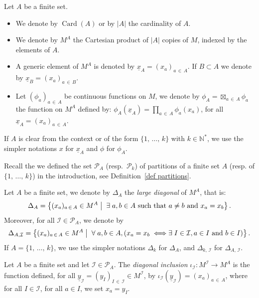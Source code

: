 \documentclass[AHL,Unicode,longabstracts,published]{cedram}
\DeclareMathOperator{\card}{Card}
\newcommand{\I}{\mathcal{I}}
\newcommand{\pa}{\mathcal{P}\!}
\newcommand{\N}{\mathbb{N}}
\newcommand{\mvert}{\mathrel{}\middle|\mathrel{}}
\let\oldexists\exists
\renewcommand*{\exists}{\mathrel{\oldexists}}
\let\oldforall\forall
\renewcommand*{\forall}{\mathrel{\oldforall}}
\begin{document}
\pagebreak
\begin{notas}\label{ntn product indexed by A}
Let $A$ be a finite set.
\begin{itemize}
\item We denote by $\card(A)$ or by $|A|$ the cardinality of $A$.
\item We denote by $M^A$ the Cartesian product of $|A|$ copies of $M$, indexed by the elements of $A$.
\item A generic element of $M^A$ is denoted by $\underline{x}_A =(x_a)_{a\,\in\,A}$. If $B \subset A$ we denote by $\underline{x}_B =(x_a)_{a\,\in\,B}$.
\item Let $(\phi_a)_{a\,\in\,A}$ be continuous functions on $M$, we denote by $\phi_A = \boxtimes_{a\,\in\,A}\phi_a$ the function on $M^A$ defined by: $\phi_A(\underline{x}_A)=\prod_{a\,\in\,A}\phi_a(x_a)$, for all $\underline{x}_A = (x_a)_{a\,\in \,A}$.
\end{itemize}
If $A$ is clear from the context or of the form $\{1,\,\dots,\,k\}$ with $k \in \N^*$, we use the simpler notations $x$ for $\underline{x}_A$ and $\phi$ for $\phi_A$.
\end{notas}

Recall the we defined the set $\pa_A$ (resp.~$\pa_k$) of partitions of a finite set $A$ (resp. of $\{1,\,\dots,\,k\}$) in the introduction, see Definition~\ref{def partitions}.

\begin{defi}[{Diagonals}]\label{def diagonals}
Let $A$ be a finite set, we denote by $\Delta_A$ the \emph{large diagonal} of $M^A$, that is:
\[
\Delta_A = \left\{(x_a)_{a\,\in\,A}\in M^A \mvert \strut \exists a,b \in A \text{ such that } a \neq b \text{ and } x_a = x_b \right\}.
\]
Moreover, for all $\I \in \pa_A$, we denote by
\[
\Delta_{A,\I} = \left\{(x_a)_{a\,\in\,A}\in M^A \mvert \strut \forall a,b \in A, \left(x_a=x_b \iff \exists I \in \I, a \in I \text{ and } b \in I \right)\right\}.
\]
If $A = \{1,\,\dots,\,k\}$, we use the simpler notations $\Delta_k$ for $\Delta_A$, and $\Delta_{k,\,\I}$ for $\Delta_{A,\,\I}$.
\end{defi}

\begin{defi}\label{def diagonal inclusions}
Let $A$ be a finite set and let $\I \in \pa_A$. The \emph{diagonal inclusion} $\iota_\I:M^\I\rightarrow M^A$ is the function defined, for all $\underline{y}_\I= (y_I)_{I\,\in\,\I} \in M^\I$, by $\iota_\I(\underline{y}_\I)= (x_a)_{a\,\in\,A}$, where for all $I \in \I$, for all $a \in I$, we set $x_a = y_I$.
\end{defi}
\end{document}
